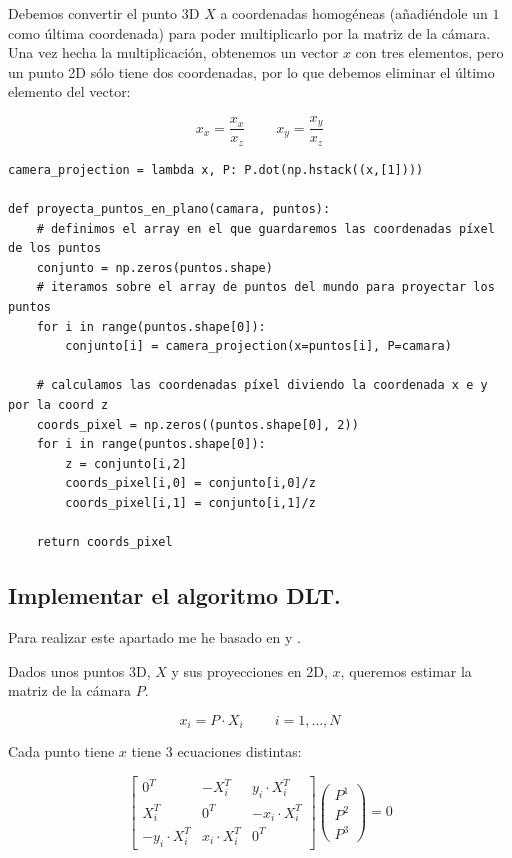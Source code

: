 \documentclass[11pt,a4paper]{article}
\theoremstyle{plain}
\theoremstyle{definition}
\begin{document}
Debemos convertir el punto 3D $X$ a coordenadas homogéneas (añadiéndole un $1$ como última coordenada) para poder multiplicarlo por la matriz de la cámara. Una vez hecha la multiplicación, obtenemos un vector $x$ con tres elementos, pero un punto 2D sólo tiene dos coordenadas, por lo que debemos eliminar el último elemento del vector:

\begin{displaymath}
x_x = \frac{x_x}{x_z} \qquad\ x_y = \frac{x_y}{x_z}
\end{displaymath}

\begin{verbatim}
camera_projection = lambda x, P: P.dot(np.hstack((x,[1])))

def proyecta_puntos_en_plano(camara, puntos):
    # definimos el array en el que guardaremos las coordenadas píxel de los puntos
    conjunto = np.zeros(puntos.shape)
    # iteramos sobre el array de puntos del mundo para proyectar los puntos
    for i in range(puntos.shape[0]):
        conjunto[i] = camera_projection(x=puntos[i], P=camara)

    # calculamos las coordenadas píxel diviendo la coordenada x e y por la coord z
    coords_pixel = np.zeros((puntos.shape[0], 2))
    for i in range(puntos.shape[0]):
        z = conjunto[i,2]
        coords_pixel[i,0] = conjunto[i,0]/z
        coords_pixel[i,1] = conjunto[i,1]/z

    return coords_pixel
\end{verbatim}

\subsection{Implementar el algoritmo DLT.}

Para realizar este apartado me he basado en \cite{mvg} y \cite{forelas}.

Dados unos puntos 3D, $X$ y sus proyecciones en 2D, $x$, queremos estimar la matriz de la cámara $P$.

\begin{displaymath}
x_i = P \cdot X_i \qquad\ i = 1, \ldots, N
\end{displaymath}

Cada punto tiene $x$ tiene 3 ecuaciones distintas:

\begin{displaymath}
\left[ 
    \begin{array}{ccc}
    0^T & -X_i^T & y_i\cdot X_i^T \\
    X_i^T & 0^T & -x_i\cdot X_i^T \\
    -y_i \cdot X_i^T & x_i \cdot X_i^T & 0^T
    \end{array} \right] \left( \begin{array}{c}
    P^1 \\
    P^2 \\
    P^3
    \end{array} \right) = 0
\end{displaymath}
\end{document}
